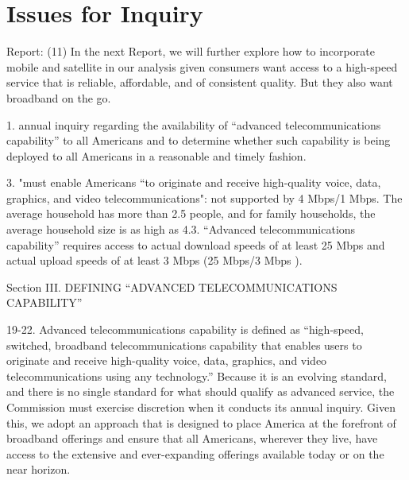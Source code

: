 \section{Issues for Inquiry}
\label{sec:issues}

Report: (11) In the next Report, we will further explore how to incorporate mobile and satellite in our analysis given consumers want access to a high-speed service that is reliable, affordable, and of consistent quality. But they also want broadband on the go.

1. annual inquiry regarding the availability of “advanced telecommunications capability” to all Americans and to determine whether such capability is being deployed to all Americans in a reasonable and timely fashion.

3. "must enable Americans “to originate and receive high-quality voice, data, graphics, and video telecommunications": not supported by 4 Mbps/1 Mbps. The average household has more than 2.5 people, and for family households, the average household size is as high as 4.3. “Advanced telecommunications capability” requires access to actual download speeds of at least 25 Mbps and actual upload speeds of at least 3 Mbps (25 Mbps/3 Mbps ).


Section III. DEFINING “ADVANCED TELECOMMUNICATIONS CAPABILITY”
 
19-22. Advanced telecommunications capability is defined as “high-speed, switched, broadband telecommunications capability that enables users to originate and receive high-quality voice, data, graphics, and video telecommunications using any technology.” Because it is an evolving standard, and there is no single standard for what should qualify as advanced service, the Commission must exercise discretion when it conducts its annual inquiry. Given this, we adopt an approach that is designed to place America at the forefront of broadband offerings and ensure that all Americans, wherever they live, have access to the extensive and ever-expanding offerings available today or on the near horizon.

